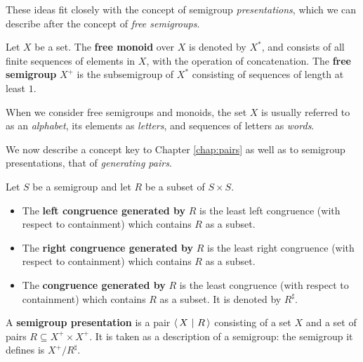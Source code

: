 These ideas fit closely with the concept of semigroup \textit{presentations},
which we can describe after the concept of \textit{free semigroups}.

\begin{definition}
  \label{def:free}
  Let $X$ be a set.  The \textbf{free monoid} over $X$ is denoted by $X^*$, and
  consists of all finite sequences of elements in $X$, with the operation of
  concatenation.  The \textbf{free semigroup} $X^+$ is the subsemigroup of $X^*$
  consisting of sequences of length at least $1$.
\end{definition}

When we consider free semigroups and monoids, the set $X$ is usually referred to
as an \textit{alphabet}, its elements as \textit{letters}, and sequences of
letters as \textit{words}.

We now describe a concept key to Chapter \ref{chap:pairs} as well as to
semigroup presentations, that of \textit{generating pairs}.

\begin{definition}
  \label{def:gen-pairs}
  Let $S$ be a semigroup and let $R$ be a subset of $S \times S$.
  \begin{itemize}
  \item
    The \textbf{left congruence generated by} $R$ is the least left congruence
    (with respect to containment) which contains $R$ as a subset.
  \item
    The \textbf{right congruence generated by} $R$ is the least right congruence
    (with respect to containment) which contains $R$ as a subset.
  \item
    The \textbf{congruence generated by} $R$ is the least congruence
    (with respect to containment) which contains $R$ as a subset.  It is denoted
    by $R^\sharp$.
  \end{itemize}
\end{definition}

\begin{definition}
  \label{def:presentation}
  A \textbf{semigroup presentation} is a pair $\left\langle\,X ~\middle|~ R\,\right\rangle$ consisting of a set
  $X$ and a set of pairs $R \subseteq X^+ \times X^+$.  It is taken as a
  description of a semigroup: the semigroup it defines is $X^+ / R^\sharp$.
\end{definition}
